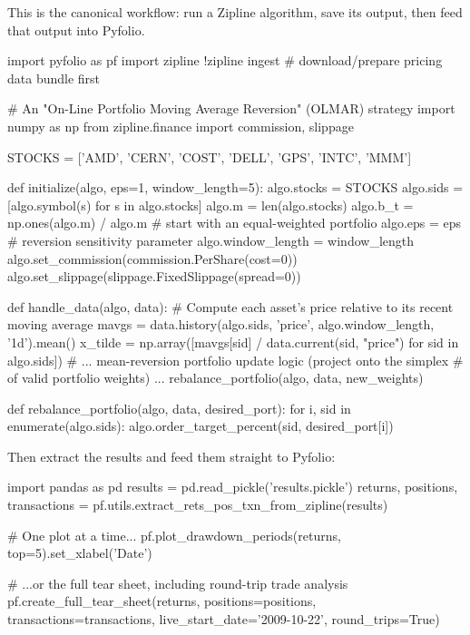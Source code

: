 \documentclass[12pt,openany]{book}
\theoremstyle{definition}
\theoremstyle{remark}
\begin{document}
This is the canonical workflow: run a Zipline algorithm, save its output, then feed that output into Pyfolio.

\begin{python}
import pyfolio as pf
import zipline
!zipline ingest   # download/prepare pricing data bundle first
\end{python}

\begin{python}

# An "On-Line Portfolio Moving Average Reversion" (OLMAR) strategy
import numpy as np
from zipline.finance import commission, slippage

STOCKS = ['AMD', 'CERN', 'COST', 'DELL', 'GPS', 'INTC', 'MMM']

def initialize(algo, eps=1, window_length=5):
    algo.stocks = STOCKS
    algo.sids = [algo.symbol(s) for s in algo.stocks]
    algo.m = len(algo.stocks)
    algo.b_t = np.ones(algo.m) / algo.m   # start with an equal-weighted portfolio
    algo.eps = eps                         # reversion sensitivity parameter
    algo.window_length = window_length
    algo.set_commission(commission.PerShare(cost=0))
    algo.set_slippage(slippage.FixedSlippage(spread=0))

def handle_data(algo, data):
    # Compute each asset's price relative to its recent moving average
    mavgs = data.history(algo.sids, 'price', algo.window_length, '1d').mean()
    x_tilde = np.array([mavgs[sid] / data.current(sid, "price") for sid in algo.sids])
    # ... mean-reversion portfolio update logic (project onto the simplex
    # of valid portfolio weights) ...
    rebalance_portfolio(algo, data, new_weights)

def rebalance_portfolio(algo, data, desired_port):
    for i, sid in enumerate(algo.sids):
        algo.order_target_percent(sid, desired_port[i])
\end{python}

Then extract the results and feed them straight to Pyfolio:

\begin{python}
import pandas as pd
results = pd.read_pickle('results.pickle')
returns, positions, transactions = pf.utils.extract_rets_pos_txn_from_zipline(results)

# One plot at a time...
pf.plot_drawdown_periods(returns, top=5).set_xlabel('Date')

# ...or the full tear sheet, including round-trip trade analysis
pf.create_full_tear_sheet(returns, positions=positions, transactions=transactions,
                          live_start_date='2009-10-22', round_trips=True)
\end{python}
\end{document}
